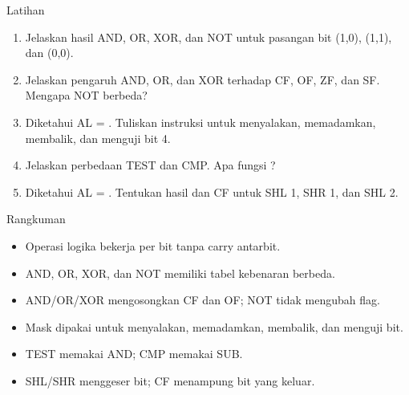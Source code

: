 \documentclass[aspectratio=169,11pt]{beamer}
\begin{document}
\begin{frame}{Latihan}
\small
\begin{enumerate}
    \item Jelaskan hasil AND, OR, XOR, dan NOT untuk pasangan bit
          (1,0), (1,1), dan (0,0).

    \vspace{0.15em}
    \item Jelaskan pengaruh AND, OR, dan XOR terhadap CF, OF, ZF,
          dan SF. Mengapa NOT berbeda?

    \vspace{0.15em}
    \item Diketahui AL = . Tuliskan instruksi untuk
          menyalakan, memadamkan, membalik, dan menguji bit 4.

    \vspace{0.15em}
    \item Jelaskan perbedaan TEST dan CMP. Apa fungsi
          ?

    \vspace{0.15em}
    \item Diketahui AL = . Tentukan hasil dan CF
          untuk SHL 1, SHR 1, dan SHL 2.
\end{enumerate}
\end{frame}

\begin{frame}{Rangkuman}
\small
\begin{itemize}
    \item Operasi logika bekerja per bit tanpa carry antarbit.

    \vspace{0.15em}
    \item AND, OR, XOR, dan NOT memiliki tabel kebenaran berbeda.

    \vspace{0.15em}
    \item AND/OR/XOR mengosongkan CF dan OF; NOT tidak mengubah
          flag.

    \vspace{0.15em}
    \item Mask dipakai untuk menyalakan, memadamkan, membalik, dan
          menguji bit.

    \vspace{0.15em}
    \item TEST memakai AND; CMP memakai SUB.

    \vspace{0.15em}
    \item SHL/SHR menggeser bit; CF menampung bit yang keluar.
\end{itemize}
\end{frame}
\end{document}
